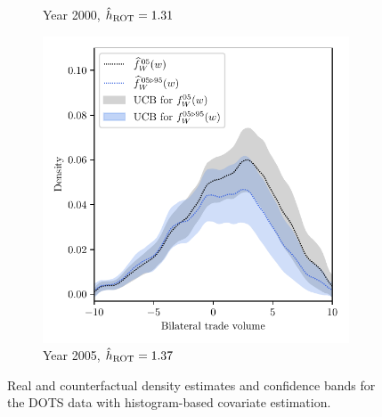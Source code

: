 \begin{figure}[ht]
\begin{subfigure}{0.32\textwidth}
    \caption{Year 2000, $\hat h_{\operatorname{ROT}} = 1.31$}
  \end{subfigure}
  \begin{subfigure}{0.32\textwidth}
    \centering
    \includegraphics[scale=0.48]{graphics/trade_plot_1995_2005.pdf}
    \caption{Year 2005, $\hat h_{\operatorname{ROT}} = 1.37$}
  \end{subfigure}
  \caption{Real and counterfactual density estimates
    and confidence bands for the DOTS data with histogram-based
    covariate estimation.}
  \label{fig:app_trade}
\end{figure}

